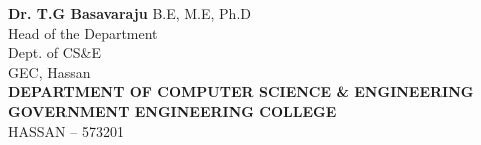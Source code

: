 \documentclass[12pt, a4paper]{report}
\begin{document}
\begin{titlepage}
\begin{center}
{\begin{minipage}[t][25cm][t]{15cm}
\begin{center}
{\textbf{Dr. T.G Basavaraju}{\tiny{ B.E, M.E, Ph.D}}\\
Head of the Department\\
Dept. of CS\&E\\
GEC, Hassan\\[0.5cm]
}
\textbf{DEPARTMENT OF COMPUTER SCIENCE \& ENGINEERING}\\[0.2cm]
\textbf{GOVERNMENT ENGINEERING COLLEGE}\\[0.2cm]
HASSAN – 573201\\[0.3cm]

\end{center}

\end{minipage}
}
\end{center}

\end{titlepage}
\end{document}
